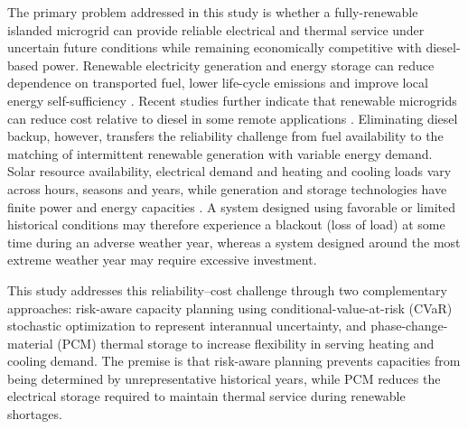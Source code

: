 \documentclass[
  journal=large,
  manuscript=article-type,
  year=2020,
  volume=37,
]{cup-journal}
\begin{document}
The primary problem addressed in this study is whether a fully-renewable islanded microgrid can provide reliable electrical and thermal service under uncertain future conditions while remaining economically competitive with diesel-based power. Renewable electricity generation and energy storage can reduce dependence on transported fuel, lower life-cycle emissions and improve local energy self-sufficiency \parencite{ref5,ref6}. Recent studies further indicate that renewable microgrids can reduce cost relative to diesel in some remote applications \parencite{ref6,ref7}. Eliminating diesel backup, however, transfers the reliability challenge from fuel availability to the matching of intermittent renewable generation with variable energy demand. Solar resource availability, electrical demand and heating and cooling loads vary across hours, seasons and years, while generation and storage technologies have finite power and energy capacities \parencite{ref7,ref8}. A system designed using favorable or limited historical conditions may therefore experience a blackout (loss of load) at some time during an adverse weather year, whereas a system designed around the most extreme weather year may require excessive investment.

This study addresses this reliability--cost challenge through two complementary approaches: risk-aware capacity planning using conditional-value-at-risk (CVaR) stochastic optimization to represent interannual uncertainty, and phase-change-material (PCM) thermal storage to increase flexibility in serving heating and cooling demand. The premise is that risk-aware planning prevents capacities from being determined by unrepresentative historical years, while PCM reduces the electrical storage required to maintain thermal service during renewable shortages.
\end{document}
